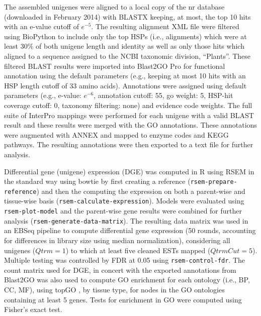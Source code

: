\documentclass[11pt]{article}
\begin{document}
The assembled unigenes were aligned to a local copy of the nr database
(downloaded in February 2014) with BLASTX \citep{citeulike:238188}
keeping, at most, the top 10 hits with an e-value cutoff of
$e^{-5}$. The resulting alignment XML file were filtered using
BioPython \citep[v.\ 1.6.4]{citeulike:4202607} to include only the top
HSPs (i.e., alignments) which were at least 30\% of both unigene
length and identity as well as only those hits which aligned to a
sequence assigned to the NCBI taxonomic division, ``Plants''. These
filtered BLAST results were imported into Blast2GO Pro \citep[v.\
2.7.2, bg2\_sep14]{citeulike:2733895} for functional annotation using
the default parameters (e.g., keeping at most 10 hits with an HSP
length cutoff of 33 amino acids).  Annotations were assigned using
default parameters (e.g., e-value: $e^{-6}$, annotation cutoff: 55, go
weight: 5, HSP-hit coverage cutoff: 0, taxonomy filtering: none) and
evidence code weights. The full suite of InterPro
\citep{citeulike:12942060} mappings were performed for each unigene
with a valid BLAST result and these results were merged with the GO
annotations.  These annotations were augmented with ANNEX
\citep{annex} and mapped to enzyme codes and KEGG
\citep{citeulike:9172127} pathways. The resulting annotations were
then exported to a text file for further analysis. 

Differential gene (unigene) expression (DGE) was computed in R
\citep[v. 3.1.1]{R} using RSEM
\citep[v. 1.2.15]{Li:BmcBioinformatics:2011} in the standard way using
bowtie \citep[v. 2.2.3]{Langmead:NatMethods:2012} by first creating a
reference (\texttt{rsem-prepare-reference}) and then the computing the
expression on both a parent-wise and tissue-wise basis
(\texttt{rsem-calculate-expression}). Models were evaluated using
\texttt{rsem-plot-model} and the parent-wise gene results were
combined for further analysis
(\texttt{rsem-generate-data-matrix}). The resulting data matrix was
used in an EBSeq \citep{Leng:Bioinformatics:2013} pipeline to compute
differential gene expression (50 rounds, accounting for differences in
library size using median normalization), considering all unigenes
($Qtrm=1$) to which at least five cleaned ESTs mapped
($QtrmCut=5$). Multiple testing was controlled by FDR
\citep{benjamini1995controlling} at 0.05 using
\texttt{rsem-control-fdr}.  The count matrix used for DGE, in concert
with the exported annotations from Blast2GO was also used to compute
GO enrichment for each ontology (i.e., BP, CC, MF), using topGO
\citep{topgo}, by tissue type, for nodes in the GO ontologies
containing at least 5 genes.  Tests for enrichment in GO were computed
using Fisher's exact test.
\end{document}
